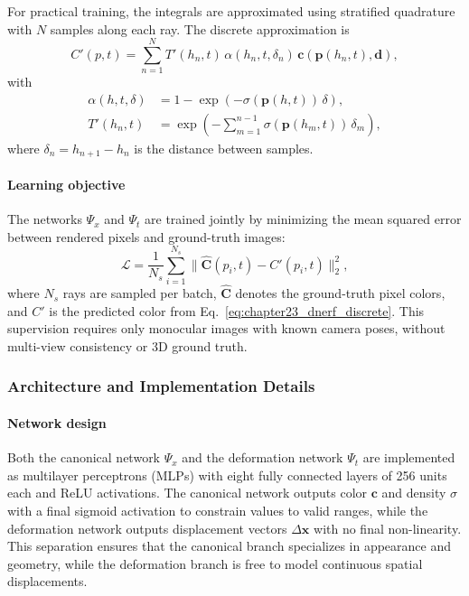 \begin{enrichment}
\begin{enrichment}
    For practical training, the integrals are approximated using stratified quadrature with $N$ samples along each ray.
    The discrete approximation is
    \begin{equation}
        C'(p, t) = \sum_{n=1}^{N} T'(h_n, t)\,\alpha(h_n, t, \delta_n)\,\mathbf{c}(\mathbf{p}(h_n,t), \mathbf{d}),
        \label{eq:chapter23_dnerf_discrete}
    \end{equation}
    with
    \begin{align}
        \alpha(h, t, \delta) &= 1 - \exp\!\left(-\sigma(\mathbf{p}(h,t)) \,\delta\right), \label{eq:chapter23_dnerf_alpha}\\
        T'(h_n, t) &= \exp\!\left(-\sum_{m=1}^{n-1} \sigma(\mathbf{p}(h_m,t))\,\delta_m\right), \label{eq:chapter23_dnerf_Tprime}
    \end{align}
    where $\delta_n = h_{n+1}-h_n$ is the distance between samples.
    
    \paragraph{Learning objective}
    \noindent
    The networks $\Psi_x$ and $\Psi_t$ are trained jointly by minimizing the mean squared error between rendered pixels and ground-truth images:
    \begin{equation}
        \mathcal{L} = \frac{1}{N_s} \sum_{i=1}^{N_s} \big\| \hat{\mathbf{C}}(p_i, t) - C'(p_i, t) \big\|_2^2,
        \label{eq:chapter23_dnerf_loss}
    \end{equation}
    where $N_s$ rays are sampled per batch, $\hat{\mathbf{C}}$ denotes the ground-truth pixel colors, and $C'$ is the predicted color from Eq.~\ref{eq:chapter23_dnerf_discrete}.
    This supervision requires only monocular images with known camera poses, without multi-view consistency or 3D ground truth.
    
    \subsubsection{Architecture and Implementation Details}
    \label{subsec:chapter23_dnerf_architecture}
    
    \paragraph{Network design}
    \noindent
    Both the canonical network $\Psi_x$ and the deformation network $\Psi_t$ are implemented as multilayer perceptrons (MLPs) with eight fully connected layers of 256 units each and ReLU activations.
    The canonical network outputs color $\mathbf{c}$ and density $\sigma$ with a final sigmoid activation to constrain values to valid ranges, while the deformation network outputs displacement vectors $\Delta \mathbf{x}$ with no final non-linearity.
    This separation ensures that the canonical branch specializes in appearance and geometry, while the deformation branch is free to model continuous spatial displacements.
    

\end{enrichment}
\end{enrichment}
